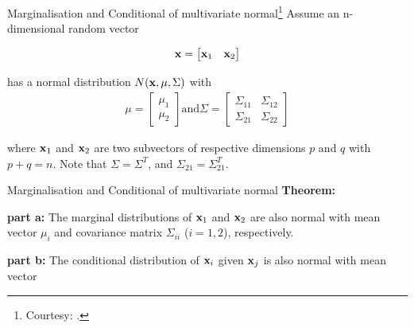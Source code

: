 \documentclass{beamer}
\begin{document}
\begin{frame}{Marginalisation and Conditional of multivariate normal\footnote{Courtesy: \nodeSeven.}}
Assume an n-dimensional random vector

\begin{equation}
	{\bf x}=\begin{bmatrix}{\bf x}_1 & {\bf x}_2\end{bmatrix} 
\end{equation}

has a normal distribution $N({\bf x},\mu,\Sigma)$ with
\begin{gather}\mu=
	\begin{bmatrix}
		\mu_1 \\
		\mu_2
	\end{bmatrix} 
	\text{and}
	\Sigma = \begin{bmatrix}
		\Sigma_{11}& \Sigma_{12}\\
		\Sigma_{21}&\Sigma_{22}
	\end{bmatrix} 
\end{gather}

where ${\bf x}_1$ and ${\bf x}_2$ are two subvectors of respective dimensions $p$ and $q$ with $p+q=n$. Note that $\Sigma=\Sigma^T$, and $\Sigma_{21}=\Sigma_{21}^T$.
\end{frame}

\begin{frame}{Marginalisation and Conditional of multivariate normal}
\textbf{Theorem:}

\textbf{part a:} The marginal distributions of ${\bf x}_1$ and ${\bf x}_2$ are also normal with mean vector $\mu_i$ and covariance matrix $\Sigma_{ii}$ ($i=1,2$), respectively.

\textbf{part b:} The conditional distribution of ${\bf x}_i$ given ${\bf x}_j$ is also normal with mean vector

\end{frame}
\end{document}
